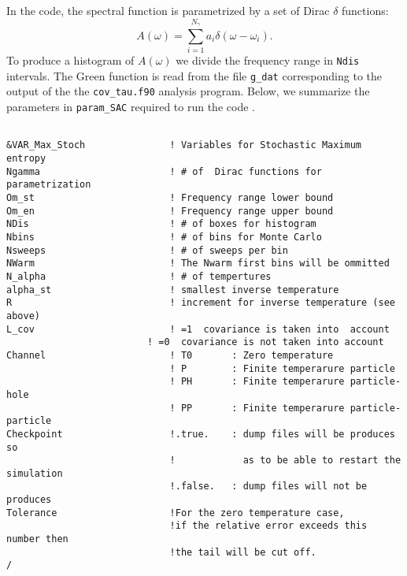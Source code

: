 In the code, the spectral function is parametrized  by a  set of Dirac $\delta$ functions: 
\begin{equation}
      A(\omega)  = \sum_{i=1}^{N_{\gamma}} a_{i} \delta \left( \omega - \omega_i \right).
\end{equation}
To produce a histogram of  $ A(\omega) $ we divide  the frequency range in \texttt{Ndis} intervals. 
The Green function is read from the file \texttt{g\_dat}  corresponding to the  output of the the  \texttt{cov\_tau.f90} analysis program.  
Below, we summarize the  parameters   in   \texttt{param\_SAC}  required  to run the code .  
\lstset{style=fortran}
\begin{lstlisting} 

&VAR_Max_Stoch               ! Variables for Stochastic Maximum entropy
Ngamma                       ! # of  Dirac functions for parametrization
Om_st                        ! Frequency range lower bound
Om_en                        ! Frequency range upper bound
NDis                         ! # of boxes for histogram
Nbins                        ! # of bins for Monte Carlo
Nsweeps                      ! # of sweeps per bin
NWarm                        ! The Nwarm first bins will be ommitted
N_alpha                      ! # of tempertures
alpha_st                     ! smallest inverse temperature
R                            ! increment for inverse temperature (see above) 
L_cov                        ! =1  covariance is taken into  account
	                     ! =0  covariance is not taken into account
Channel                      ! T0       : Zero temperature
                             ! P        : Finite temperarure particle 
                             ! PH       : Finite temperarure particle-hole
                             ! PP       : Finite temperarure particle-particle 
Checkpoint                   !.true.    : dump files will be produces so  
                             !            as to be able to restart the simulation
                             !.false.   : dump files will not be produces 
Tolerance                    !For the zero temperature case,
                             !if the relative error exceeds this number then 
                             !the tail will be cut off. 
/
\end{lstlisting}

